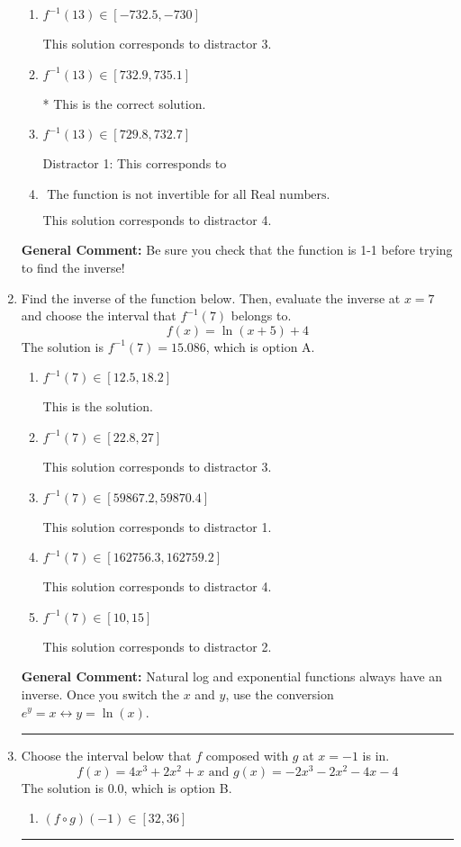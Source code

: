 \documentclass{extbook}[14pt]
\newcommand{\litem}[1]{\item #1

\rule{\textwidth}{0.4pt}}
\begin{document}
\begin{enumerate}
{\begin{enumerate}[label=\Alph*.]
 This solution corresponds to distractor 2.
\item \( f^{-1}(13) \in [-732.5, -730] \)

 This solution corresponds to distractor 3.
\item \( f^{-1}(13) \in [732.9, 735.1] \)

* This is the correct solution.
\item \( f^{-1}(13) \in [729.8, 732.7] \)

 Distractor 1: This corresponds to 
\item \( \text{ The function is not invertible for all Real numbers. } \)

 This solution corresponds to distractor 4.
\end{enumerate}

\textbf{General Comment:} Be sure you check that the function is 1-1 before trying to find the inverse!
}
\litem{
Find the inverse of the function below. Then, evaluate the inverse at $x = 7$ and choose the interval that $f^{-1}(7)$ belongs to.
\[ f(x) = \ln{(x+5)}+4 \]The solution is \( f^{-1}(7) = 15.086 \), which is option A.\begin{enumerate}[label=\Alph*.]
\item \( f^{-1}(7) \in [12.5, 18.2] \)

 This is the solution.
\item \( f^{-1}(7) \in [22.8, 27] \)

 This solution corresponds to distractor 3.
\item \( f^{-1}(7) \in [59867.2, 59870.4] \)

 This solution corresponds to distractor 1.
\item \( f^{-1}(7) \in [162756.3, 162759.2] \)

 This solution corresponds to distractor 4.
\item \( f^{-1}(7) \in [10, 15] \)

 This solution corresponds to distractor 2.
\end{enumerate}

\textbf{General Comment:} Natural log and exponential functions always have an inverse. Once you switch the $x$ and $y$, use the conversion $ e^y = x \leftrightarrow y=\ln(x)$.
}
\litem{
Choose the interval below that $f$ composed with $g$ at $x=-1$ is in.
\[ f(x) = 4x^{3} +2 x^{2} +x \text{ and } g(x) = -2x^{3} -2 x^{2} -4 x -4 \]The solution is \( 0.0 \), which is option B.\begin{enumerate}[label=\Alph*.]
\item \( (f \circ g)(-1) \in [32, 36] \)


\end{enumerate}}
\end{enumerate}
\end{document}
